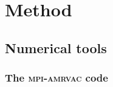 \documentclass[
    a4paper, 
    12pt, onecolumn,
]{article}
\begin{document}
\section{Method}



\subsection{Numerical tools}


\subsubsection*{The \textbf{\textsc {mpi-amrvac}} code}
\end{document}
